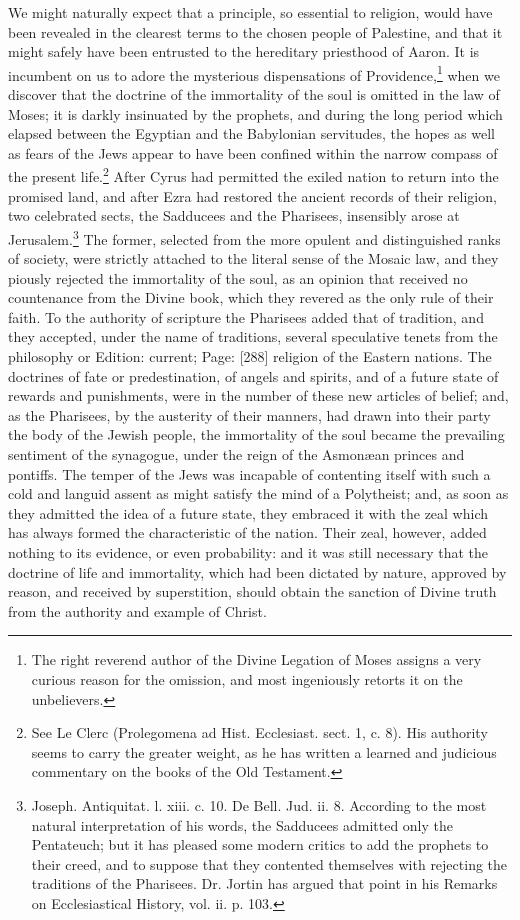 We might naturally expect that a principle, so essential to religion, would have been revealed in the clearest terms to the chosen people of Palestine, and that it might safely have been entrusted to the hereditary priesthood of Aaron. It is incumbent on us to adore the mysterious dispensations of Providence,\footnote{The right reverend author of the Divine Legation of Moses assigns a very curious reason for the omission, and most ingeniously retorts it on the unbelievers.} when we discover that the doctrine of the immortality of the soul is omitted in the law of Moses; it is darkly insinuated by the prophets, and during the long period which elapsed between the Egyptian and the Babylonian servitudes, the hopes as well as fears of the Jews appear to have been confined within the narrow compass of the present life.\footnote{See Le Clerc (Prolegomena ad Hist. Ecclesiast. sect. 1, c. 8). His authority seems to carry the greater weight, as he has written a learned and judicious commentary on the books of the Old Testament.} After Cyrus had permitted the exiled nation to return into the promised land, and after Ezra had restored the ancient records of their religion, two celebrated sects, the Sadducees and the Pharisees, insensibly arose at Jerusalem.\footnote{Joseph. Antiquitat. l. xiii. c. 10. De Bell. Jud. ii. 8. According to the most natural interpretation of his words, the Sadducees admitted only the Pentateuch; but it has pleased some modern critics to add the prophets to their creed, and to suppose that they contented themselves with rejecting the traditions of the Pharisees. Dr. Jortin has argued that point in his Remarks on Ecclesiastical History, vol. ii. p. 103.} The former, selected from the more opulent and distinguished ranks of society, were strictly attached to the literal sense of the Mosaic law, and they piously rejected the immortality of the soul, as an opinion that received no countenance from the Divine book, which they revered as the only rule of their faith. To the authority of scripture the Pharisees added that of tradition, and they accepted, under the name of traditions, several speculative tenets from the philosophy or Edition: current; Page: [288] religion of the Eastern nations. The doctrines of fate or predestination, of angels and spirits, and of a future state of rewards and punishments, were in the number of these new articles of belief; and, as the Pharisees, by the austerity of their manners, had drawn into their party the body of the Jewish people, the immortality of the soul became the prevailing sentiment of the synagogue, under the reign of the Asmonæan princes and pontiffs. The temper of the Jews was incapable of contenting itself with such a cold and languid assent as might satisfy the mind of a Polytheist; and, as soon as they admitted the idea of a future state, they embraced it with the zeal which has always formed the characteristic of the nation. Their zeal, however, added nothing to its evidence, or even probability: and it was still necessary that the doctrine of life and immortality, which had been dictated by nature, approved by reason, and received by superstition, should obtain the sanction of Divine truth from the authority and example of Christ.

